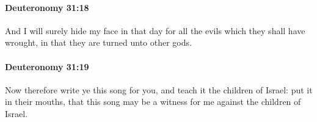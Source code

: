 		\paragraph{Deuteronomy 31:18} %
			\label{DEUTERONOMY-31-18}

			And I will surely hide my face in that day for all the evils which they shall have wrought, in that they are turned unto other gods.


		\paragraph{Deuteronomy 31:19} %
			\label{DEUTERONOMY-31-19}

			Now therefore write ye this song for you, and teach it the children of Israel: put it in their mouths, that this song may be a witness for me against the children of Israel.


